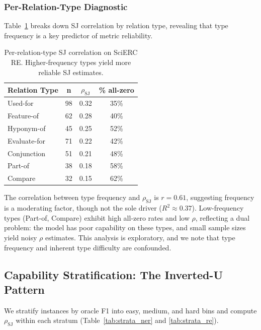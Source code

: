 \documentclass[11pt]{article}
\begin{document}
\subsubsection{Per-Relation-Type Diagnostic}

Table~\ref{tab:per_type_re} breaks down SJ correlation by relation type, revealing that type frequency is a key predictor of metric reliability.

\begin{table}[t]
\centering
\caption{Per-relation-type SJ correlation on SciERC RE. Higher-frequency types yield more reliable SJ estimates.}
\label{tab:per_type_re}
\begin{tabular}{lccc}
\toprule
\textbf{Relation Type} & \textbf{n} & \textbf{$\rho_{\text{SJ}}$} & \textbf{\% all-zero} \\
\midrule
Used-for     & 98 & 0.32 & 35\% \\
Feature-of   & 62 & 0.28 & 40\% \\
Hyponym-of   & 45 & 0.25 & 52\% \\
Evaluate-for & 71 & 0.22 & 42\% \\
Conjunction  & 51 & 0.21 & 48\% \\
Part-of      & 38 & 0.18 & 58\% \\
Compare      & 32 & 0.15 & 62\% \\
\bottomrule
\end{tabular}
\end{table}

The correlation between type frequency and $\rho_{\text{SJ}}$ is $r{=}0.61$, suggesting frequency is a moderating factor, though not the sole driver ($R^2 \approx 0.37$).
Low-frequency types (Part-of, Compare) exhibit high all-zero rates and low $\rho$, reflecting a dual problem: the model has poor capability on these types, and small sample sizes yield noisy $\rho$ estimates.
This analysis is exploratory, and we note that type frequency and inherent type difficulty are confounded.

\subsection{Capability Stratification: The Inverted-U Pattern}
\label{sec:stratification}

We stratify instances by oracle F1 into easy, medium, and hard bins and compute $\rho_{\text{SJ}}$ within each stratum (Table~\ref{tab:strata_ner} and \ref{tab:strata_re}).
\end{document}
